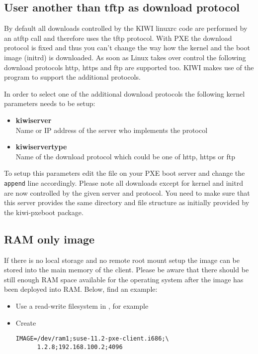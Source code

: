 \subsection{User another than tftp as download protocol}

By default all downloads controlled by the KIWI linuxrc code
are performed by an atftp call and therefore uses the tftp
protocol. With PXE the download protocol is fixed and thus you
can't change the way how the kernel and the boot image (initrd)
is downloaded. As soon as Linux takes over control the following
download protocols http, https and ftp are supported too.
KIWI makes use of the  program to support the
additional protocols.

In order to select one of the additional download protocols
the following kernel parameters needs to be setup:

\begin{itemize}
\item \textbf{kiwiserver}\\
      Name or IP address of the server who implements the protocol
\item \textbf{kiwiservertype}\\
      Name of the download protocol which could be one of http, https 
      or ftp
\end{itemize}

To setup this parameters edit the file
 on your PXE boot server
and change the \texttt{append} line accordingly. Please note all
downloads except for kernel and initrd are now controlled by the given
server and protocol. You need to make sure that this server provides
the same directory and file structure as initially provided by
the kiwi-pxeboot package.

\subsection{RAM only image}

If there is no local storage and no remote root mount setup
the image can be stored into the main memory of the client.
Please be aware that there should be still enough RAM space
available for the operating system after the image has been
deployed into RAM. Below, find an example:

\begin{itemize}
\item Use a read-write filesystem in , for example
\item Create 

\begin{verbatim}
IMAGE=/dev/ram1;suse-11.2-pxe-client.i686;\
      1.2.8;192.168.100.2;4096
\end{verbatim}
\end{itemize}

